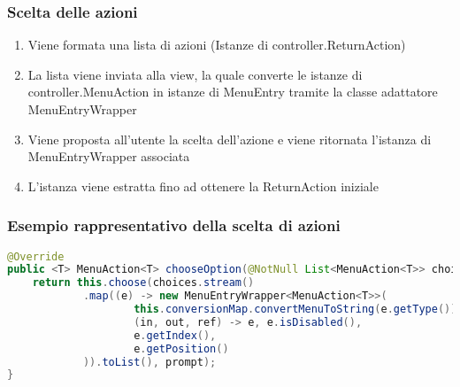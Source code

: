 \begin{frame}
    \frametitle{Scelta delle azioni}

    \begin{minipage}{.49\textwidth}
        \begin{enumerate}
            \item<1-> Viene formata una lista di azioni (Istanze di controller.ReturnAction)
            \item<2-> La lista viene inviata alla view, la quale converte le istanze di controller.MenuAction in istanze di MenuEntry tramite la classe adattatore MenuEntryWrapper
            \item<3-> Viene proposta all'utente la scelta dell'azione e viene ritornata l'istanza di MenuEntryWrapper associata
            \item <4-> L'istanza viene estratta fino ad ottenere la ReturnAction iniziale
        \end{enumerate}
    \end{minipage}
    \begin{minipage}{.49\textwidth}
        \begin{figure}
            \centering
        \end{figure}
    \end{minipage}
    
\end{frame}

\begin{frame}[fragile]
    \frametitle{Esempio rappresentativo della scelta di azioni}
    \lstset{style=java}
    \begin{lstlisting}[language=java, caption={Snippet tratto da StreamView\#chooseOption()}]
@Override
public <T> MenuAction<T> chooseOption(@NotNull List<MenuAction<T>> choices, PromptType prompt) {
    return this.choose(choices.stream()
            .map((e) -> new MenuEntryWrapper<MenuAction<T>>(
                    this.conversionMap.convertMenuToString(e.getType()),
                    (in, out, ref) -> e, e.isDisabled(),
                    e.getIndex(),
                    e.getPosition()
            )).toList(), prompt);
}
    \end{lstlisting}
\end{frame}

